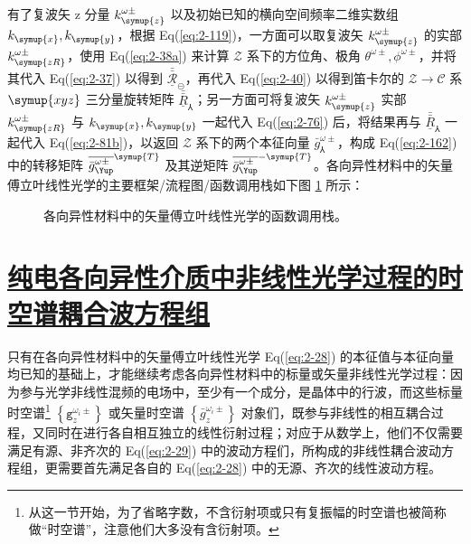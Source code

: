 有了复波矢 z 分量 $k^{\omega\pm}_{\symup{z}}$ 以及初始已知的横向空间频率二维实数组 $k_{\symup{x}},k_{\symup{y}}$，根据 Eq(\ref{eq:2-119})，一方面可以取复波矢 $k^{\omega\pm}_{\symup{z}}$ 的实部 $k^{\omega\pm}_{\symup{zR}}$，使用 Eq(\ref{eq:2-38a}) 来计算 $\mathcal Z$ 系下的方位角、极角 $\theta^{\omega\pm}, \phi^{\omega\pm}$，并将其代入 Eq(\ref{eq:2-37}) 以得到 $\bar{\bar{\underline{\mathcal{R}}}}_{\circleddash}$，再代入 Eq(\ref{eq:2-40}) 以得到笛卡尔的 $\mathcal Z \to \mathcal C$ 系 $\symup{xyz}$ 三分量旋转矩阵 $\bar{\bar{\underline{R}}}_{\Yup}$；另一方面可将复波矢 $k^{\omega\pm}_{\symup{z}}$ 实部 $k^{\omega\pm}_{\symup{zR}}$ 与 $k_{\symup{x}},k_{\symup{y}}$ 一起代入 Eq(\ref{eq:2-76}) 后，将结果再与 $\bar{\bar{\underline{R}}}_{\Yup}$ 一起代入 Eq(\ref{eq:2-81b})，以返回 $\mathcal Z$ 系下的两个本征向量 $\bar{g}^{\omega\pm}_{\Yup}$，构成 Eq(\ref{eq:2-162}) 中的转移矩阵 $\overline{\bar{g}^{\omega\pm}_{\Yup}}^{\symup{T}}$ 及其逆矩阵 $\overline{\bar{g}^{\omega\pm}_{\Yup}}^{-\symup{T}}$。各向异性材料中的矢量傅立叶线性光学的主要框架/流程图/函数调用栈如下图 \ref{fig:2-2} 所示：
\begin{figure}[htbp]
	\belowdisplayskip=0pt
	\caption{\label{fig:2-2} 各向异性材料中的矢量傅立叶线性光学的函数调用栈。}
\end{figure}

\section{\protect\hyperlink{chap:\thesection}{纯电各向异性介质中非线性光学过程的时空谱耦合波方程组}}
\label{纯电各向异性介质中非线性光学过程的时空谱耦合波方程组}

只有在各向异性材料中的矢量傅立叶线性光学 Eq(\ref{eq:2-28}) 的本征值与本征向量均已知的基础上，才能继续考虑各向异性材料中的标量或矢量非线性光学过程：因为参与光学非线性混频的电场中，至少有一个成分，是晶体中的行波，而这些标量时空谱\footnote{从这一节开始，为了省略字数，不含衍射项或只有复振幅的时空谱也被简称做“时空谱”，注意他们大多没有含衍射项。} $\left\{ {\mathtt{g}}^{\omega_i\pm}_{z} \right\}$ 或矢量时空谱 $\left\{ \bar{g}^{\omega_i\pm}_{z} \right\}$ 对象们，既参与非线性的相互耦合过程，又同时在进行各自相互独立的线性衍射过程；对应于从数学上，他们不仅需要满足有源、非齐次的 Eq(\ref{eq:2-29}) 中的波动方程们，所构成的非线性耦合波动方程组，更需要首先满足各自的 Eq(\ref{eq:2-28}) 中的无源、齐次的线性波动方程。

